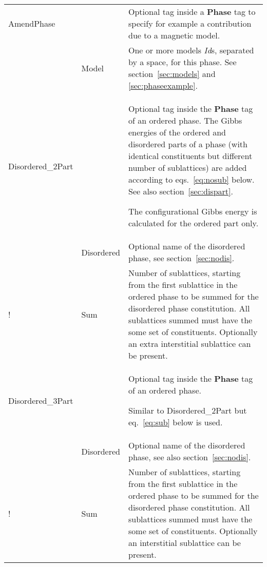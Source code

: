 \documentclass{article}
\begin{document}
\begin{tabular}{|p{} p{} p{}|}
  AmendPhase & & Optional tag inside a {\bf Phase} tag to specify
               for example a contribution due to a magnetic model.\\
           & Model & One or more models {\em Id}s, separated by a space, for 
             this phase.  See section~\ref{sec:models} and 
             \ref{sec:phaseexample}.\\\hline

  Disordered\_2Part & & Optional tag inside the {\bf Phase} tag of an 
              ordered phase.
              The Gibbs energies of the ordered and disordered parts
              of a phase (with identical constituents but different
              number of sublattices) are added according to
              eqs.~\ref{eq:nosub} below.  See also section~\ref{sec:dispart}.

              The configurational Gibbs energy is calculated for
              the ordered part only.  \\

   & Disordered & Optional name of the disordered  phase, 
             see section~\ref{sec:nodis}.\\

!  & Sum & Number of sublattices, starting from the first sublattice in the
              ordered phase to be summed for the disordered phase
              constitution.  All sublattices summed must have the some
              set of constituents.  Optionally an extra interstitial
              sublattice can be present.\\\hline

   Disordered\_3Part & & Optional tag inside the {\bf Phase} tag of an
              ordered phase.

              Similar to Disordered\_2Part but eq.~\ref{eq:sub} below is used.\\

        & Disordered & Optional name of the disordered phase, see also section~\ref{sec:nodis}.\\

!  & Sum & Number of sublattices, starting from the first sublattice in the
              ordered phase to be summed for the disordered phase
              constitution.  All sublattices summed must have the some
              set of constituents.  Optionally an interstitial sublattice
              can be present.\\\hline

\end{tabular}
\end{document}
